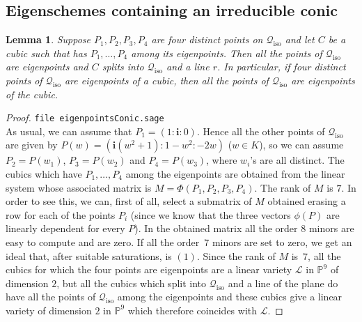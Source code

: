 \documentclass{amsart}
\theoremstyle{plain}
\newtheorem{lemma}{Lemma}[section]
\theoremstyle{definition}
\newcommand{\iso}{\mathcal{Q}_{\mathrm{iso}}}
\newcommand{\iii}{\textbf{i}}
\begin{document}
\subsection{Eigenschemes containing an irreducible conic}
\begin{lemma}
\label{lemma:fourOnIso}
Suppose $P_1, P_2, P_3, P_4$ are four distinct points on $\iso$ and let
$C$ be a cubic such that has $P_1, \dots, P_4$ among its eigenpoints.
Then all the points of $\iso$ are eigenpoints and $C$ splits into $\iso$
and a line $r$. In particular, if four
distinct points of $\iso$ are eigenpoints of a cubic, then all the
points of $\iso$ are eigenpoints of the cubic.
\end{lemma}
\begin{proof}
\verb+file eigenpointsConic.sage+\\
As usual, we can assume that $P_1 = (1: \iii: 0)$. Hence all the other points
of $\iso$ are given by
$P(w) = (\iii(w^2 + 1): 1 - w^2: -2w)$ ($w\in K$), so we can assume
$P_2 = P(w_1)$, $P_3 = P(w_2)$ and $P_4 = P(w_3)$, where $w_i$'s are
all distinct. The cubics which have $P_1, \dots, P_4$ among the eigenpoints
are obtained from the linear system whose associated matrix is
$M = \Phi(P_1, P_2, P_3, P_4)$. The rank of $M$ is $7$. In order to see this,
we can, first of all, select a submatrix of $M$ obtained erasing a
row for each of the points $P_i$ (since we know that the three vectors
$\phi(P)$ are linearly dependent for every $P$). In the obtained matrix
all the order $8$ minors are easy to compute and are zero.
If all the order~$7$
minors are set to zero, we get an ideal that, after suitable saturations,
is $(1)$. Since the rank of $M$ is~$7$, all the cubics for which the
four points are eigenpoints are a linear variety $\mathcal{L}$
in $\mathbb{P}^9$
of dimension $2$, but all the cubics which split into $\iso$ and a line
of the plane do have all the points of $\iso$ among the eigenpoints and
these cubics give a linear variety of dimension $2$ in $\mathbb{P}^9$
which therefore coincides with $\mathcal{L}$.
\end{proof}
\end{document}
